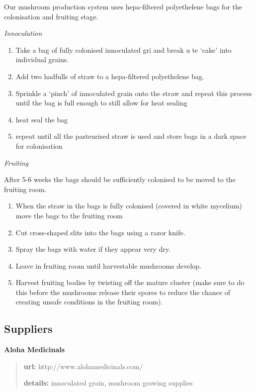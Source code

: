 Our mushroom production system uses hepa-filtered polyethelene bags for
the colonisation and fruiting stage.

\emph{Innoculation}

\begin{enumerate}
\def\labelenumi{\arabic{enumi}.}
\itemsep1pt\parskip0pt
\item
  Take a bag of fully colonised innoculated gri and break u te `cake'
  into individual grains.
\item
  Add two hadfulls of straw to a hepa-filtered polyethelene bag.
\item
  Sprinkle a `pinch' of innoculated grain onto the straw and repeat this
  process until the bag is full enough to still allow for heat sealing
\item
  heat seal the bag
\item
  repeat until all the pasteurised straw is used and store bags in a
  dark space for colonisation
\end{enumerate}

\emph{Fruiting}

After 5-6 weeks the bags should be sufficiently colonised to be moved to
the fruiting room.

\begin{enumerate}
\def\labelenumi{\arabic{enumi}.}
\itemsep1pt\parskip0pt
\item
  When the straw in the bags is fully colonised (covered in white
  mycelium) move the bags to the fruiting room
\item
  Cut cross-shaped slits into the bags using a razor knife.
\item
  Spray the bags with water if they appear very dry.
\item
  Leave in fruiting room until harvestable mushrooms develop.
\item
  Harvest fruiting bodies by twisting off the mature cluster (make sure
  to do this before the mushrooms release their spores to reduce the
  chance of creating unsafe conditions in the fruiting room).
\end{enumerate}

\subsection{Suppliers}\label{suppliers}

\textbf{Aloha Medicinals}

\begin{quote}
\textbf{url:} http://www.alohamedicinals.com/

\textbf{details:} innoculated grain, mushroom growing supplies
\end{quote}

